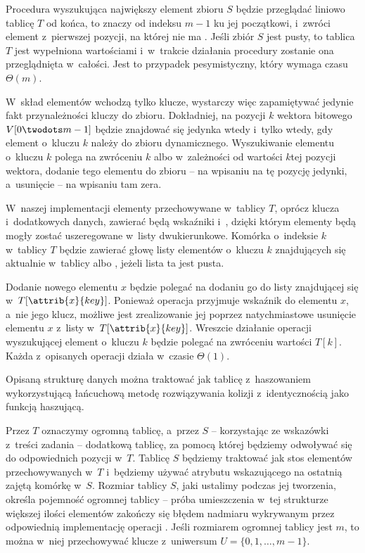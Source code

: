 
\exercise %
Procedura wyszukująca największy element zbioru $S$ będzie przeglądać liniowo tablicę $T$ od końca, to znaczy od indeksu $m-1$ ku jej początkowi, i~zwróci element z~pierwszej pozycji, na której nie ma .
Jeśli zbiór $S$ jest pusty, to tablica $T$ jest wypełniona wartościami  i~w~trakcie działania procedury zostanie ona przeglądnięta w~całości.
Jest to przypadek pesymistyczny, który wymaga czasu $\Theta(m)$.

\exercise %
W~skład elementów wchodzą tylko klucze, wystarczy więc zapamiętywać jedynie fakt przynależności kluczy do zbioru.
Dokładniej, na pozycji $k$ wektora bitowego $V[0\twodots m-1]$ będzie znajdować się jedynka wtedy i~tylko wtedy, gdy element o~kluczu $k$ należy do zbioru dynamicznego.
Wyszukiwanie elementu o~kluczu $k$ polega na zwróceniu $k$ albo  w~zależności od wartości $k$\nbhyphen tej pozycji wektora, dodanie tego elementu do zbioru -- na wpisaniu na tę pozycję jedynki, a~usunięcie -- na wpisaniu tam zera.

\exercise %
W~naszej implementacji elementy przechowywane w~tablicy $T$, oprócz klucza i~dodatkowych danych, zawierać będą wskaźniki  i~, dzięki którym elementy będą mogły zostać uszeregowane w~listy dwukierunkowe.
Komórka o~indeksie $k$ w~tablicy $T$ będzie zawierać głowę listy elementów o~kluczu $k$ znajdujących się aktualnie w~tablicy albo , jeżeli lista ta jest pusta.

Dodanie nowego elementu $x$ będzie polegać na dodaniu go do listy znajdującej się w~$T[\attrib{x}{key}]$.
Ponieważ operacja  przyjmuje wskaźnik do elementu $x$, a~nie jego klucz, możliwe jest zrealizowanie jej poprzez natychmiastowe usunięcie elementu $x$ z~listy w~$T[\attrib{x}{key}]$.
Wreszcie działanie operacji wyszukującej element o~kluczu $k$ będzie polegać na zwróceniu wartości $T[k]$.
Każda z~opisanych operacji działa w~czasie $\Theta(1)$.

Opisaną strukturę danych można traktować jak tablicę z~haszowaniem wykorzystującą łańcuchową metodę rozwiązywania kolizji z~identycznością jako funkcją haszującą.

\exercise %

\noindent Przez $T$ oznaczymy ogromną tablicę, a~przez $S$ -- korzystając ze wskazówki z~treści zadania -- dodatkową tablicę, za pomocą której będziemy odwoływać się do odpowiednich pozycji w~$T$.
Tablicę $S$ będziemy traktować jak stos elementów przechowywanych w~$T$ i~będziemy używać atrybutu  wskazującego na ostatnią zajętą komórkę w~$S$.
Rozmiar tablicy $S$, jaki ustalimy podczas jej tworzenia, określa pojemność ogromnej tablicy -- próba umieszczenia w~tej strukturze większej ilości elementów zakończy się błędem nadmiaru wykrywanym przez odpowiednią implementację operacji .
Jeśli rozmiarem ogromnej tablicy jest $m$, to można w~niej przechowywać klucze z~uniwersum $U=\{0,1,\dots,m-1\}$.

